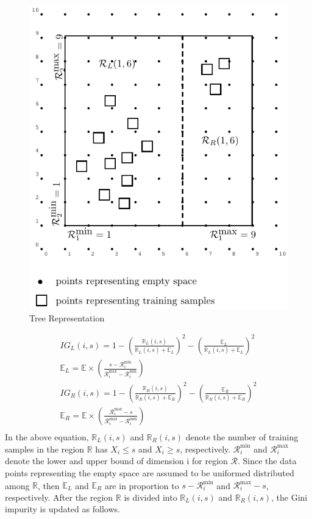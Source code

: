 \documentclass[11pt,onecolumn]{IEEEtran}
\begin{document}
\begin{figure}[h]
    \centering
    \caption{Tree Representation}
    \includegraphics[scale=1]{image/split_example.pdf} 
    \end{figure}

\begin{align*}
IG_L(i,s)=1-\left(\frac{\mathbb R_L(i,s)}{\mathbb R_L(i,s)+\mathbb E_L}\right)^2-\left(\frac{\mathbb E_L}{\mathbb R_L(i,s)+ \mathbb E_L}\right)^2\\
\mathbb E_L=\mathbb E\times \left(\frac{s- \mathcal R^{\mbox{min}}_i}{\mathcal R^{\mbox{max}}_i-\mathcal R^{\mbox{min}}_i}\right)\\
IG_R(i,s)=1-\left(\frac{\mathbb  R_R(i,s)}{\mathbb  R_R(i,s)+\mathbb  E_R}\right)^2-\left(\frac{\mathbb  E_R}{\mathbb R_R(i,s)+\mathbb  E_R}\right)^2\\
\mathbb E_R=\mathbb E\times \left(\frac{\mathcal R_i^{\mbox{max}}-s}{\mathcal R_i^{\mbox{max}}-\mathcal R_i^{\mbox{min}}}\right)\\
\end{align*}
In the above equation,  $\mathbb R_L(i,s)$ and $\mathbb R_R(i,s)$  denote the number of training samples in the region $\mathbb R$ has  $X_i\leq s$ and $X_i\geq s$, respectively. $\mathcal R^{\mbox{min}}_i$ and  $\mathcal R^{\mbox{max}}_i$ denote the lower and upper bound of dimension i for region $\mathcal R$. Since the data points representing the empty space are assumed to be uniformed distributed among $\mathbb R$, then $\mathbb E_L$ and $\mathbb E_R$  are in  proportion to $s- \mathcal R^{\mbox{min}}_i$ and $\mathcal R_i^{\mbox{max}}-s$, respectively.
After the region $\mathbb R$ is divided into $\mathbb R_L(i,s)$ and $\mathbb R_R(i,s)$, the Gini impurity is updated as follows.
\end{document}
